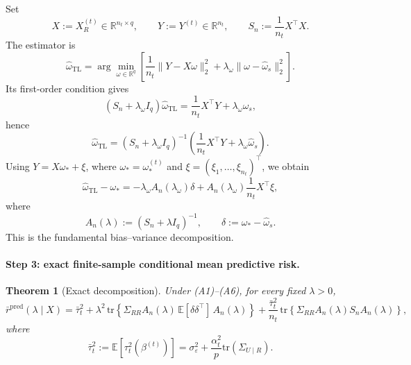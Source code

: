 \documentclass[11pt]{article}
\newcommand{\1}{\mathbf{1}}
\newtheorem{theorem}{Theorem}
\begin{document}
Set
\[
X:=X_R^{(t)}\in\mathbb R^{n_t\times q},\qquad
Y:=Y^{(t)}\in\mathbb R^{n_t},\qquad
S_n:=\frac1{n_t}X^\top X.
\]
The estimator is
\[
\hat\omega_{\mathrm{TL}}
=
\arg\min_{\omega\in\mathbb R^q}
\left[
\frac1{n_t}\|Y-X\omega\|_2^2+\lambda_\omega\|\omega-\hat\omega_s\|_2^2
\right].
\]
Its first-order condition gives
\[
(S_n+\lambda_\omega I_q)\hat\omega_{\mathrm{TL}}
=
\frac1{n_t}X^\top Y+\lambda_\omega \hat\omega_s,
\]
hence
\[
\hat\omega_{\mathrm{TL}}
=
(S_n+\lambda_\omega I_q)^{-1}
\left(\frac1{n_t}X^\top Y+\lambda_\omega\hat\omega_s\right).
\]
Using \(Y=X\omega_*+\xi\), where \(\omega_*=\omega_*^{(t)}\) and
\(\xi=(\xi_1,\dots,\xi_{n_t})^\top\), we obtain
\[
\hat\omega_{\mathrm{TL}}-\omega_*
=
-\lambda_\omega A_n(\lambda_\omega)\delta
+
A_n(\lambda_\omega)\frac1{n_t}X^\top \xi,
\]
where
\[
A_n(\lambda):=(S_n+\lambda I_q)^{-1},
\qquad
\delta:=\omega_*-\hat\omega_s.
\]
This is the fundamental bias--variance decomposition.

\bigskip

\paragraph{Step 3: exact finite-sample conditional mean predictive risk.}

\begin{theorem}[Exact decomposition]
Under (A1)--(A6), for every fixed \(\lambda>0\),
\[
\bar r^{\mathrm{pred}}(\lambda\mid X)
=
\bar\tau_t^2
+
\lambda^2\,\mathrm{tr}\!\left\{
\Sigma_{RR}A_n(\lambda)\,\mathbb E[\delta\delta^\top]\,A_n(\lambda)
\right\}
+
\frac{\bar\tau_t^2}{n_t}\,
\mathrm{tr}\!\left\{
\Sigma_{RR}A_n(\lambda)S_nA_n(\lambda)
\right\},
\]
where
\[
\bar\tau_t^2:=\mathbb E[\tau_t^2(\beta^{(t)})]
=
\sigma_\varepsilon^2+\frac{\alpha_t^2}{p}\mathrm{tr}(\Sigma_{U\mid R}).
\]
\end{theorem}
\end{document}
